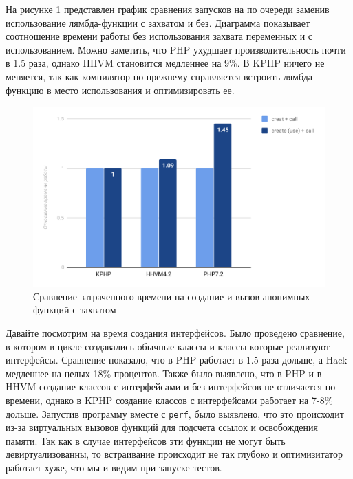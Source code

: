 На рисунке \ref{fig:benchmark-create_use_call-simple} представлен график сравнения запусков на по очереди заменив использование лямбда-функции с захватом и без.
Диаграмма показывает соотношение времени работы без использования захвата переменных и с использованием.
Можно заметить, что PHP ухудшает производительность почти в 1.5 раза, однако HHVM становится медленнее на 9\%.
В KPHP ничего не меняется, так как компилятор по прежнему справляется встроить лямбда-функцию в место использования и оптимизировать ее.
\begin{figure}[H]
    \caption{Сравнение затраченного времени на создание и вызов анонимных функций с захватом}
    \label{fig:benchmark-create_use_call-simple}
    \centering
    \includegraphics[width=\linewidth]{images/benchmark_create_use_call_simple}
\end{figure}

Давайте посмотрим на время создания интерфейсов.
Было проведено сравнение, в котором в цикле создавались обычные классы и классы которые реализуют интерфейсы.
Сравнение показало, что в PHP работает в 1.5 раза дольше, а Hack медленнее на целых 18\% процентов.
Также было выявлено, что в PHP и в HHVM создание классов с интерфейсами и без интерфейсов не отличается по времени,
однако в KPHP создание классов с интерфейсами работает на 7-8\% дольше.
Запустив программу вместе с \verb|perf|, было выявлено, что это происходит из-за виртуальных вызовов функций для подсчета ссылок и освобождения памяти.
Так как в случае интерфейсов эти функции не могут быть девиртуализованны\cite{devirtualization}, то встраивание происходит не так глубоко и оптимизитатор работает хуже, что мы и видим при запуске тестов.

